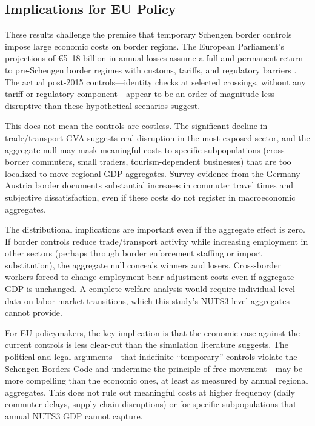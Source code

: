 \documentclass[12pt]{article}
\begin{document}
\subsection{Implications for EU Policy}

These results challenge the premise that temporary Schengen border controls impose large economic costs on border regions. The European Parliament's projections of \euro{}5--18 billion in annual losses assume a full and permanent return to pre-Schengen border regimes with customs, tariffs, and regulatory barriers \citep{EP2016Schengen}. The actual post-2015 controls---identity checks at selected crossings, without any tariff or regulatory component---appear to be an order of magnitude less disruptive than these hypothetical scenarios suggest.

This does not mean the controls are costless. The significant decline in trade/transport GVA suggests real disruption in the most exposed sector, and the aggregate null may mask meaningful costs to specific subpopulations (cross-border commuters, small traders, tourism-dependent businesses) that are too localized to move regional GDP aggregates. Survey evidence from the Germany--Austria border documents substantial increases in commuter travel times and subjective dissatisfaction, even if these costs do not register in macroeconomic aggregates.

The distributional implications are important even if the aggregate effect is zero. If border controls reduce trade/transport activity while increasing employment in other sectors (perhaps through border enforcement staffing or import substitution), the aggregate null conceals winners and losers. Cross-border workers forced to change employment bear adjustment costs even if aggregate GDP is unchanged. A complete welfare analysis would require individual-level data on labor market transitions, which this study's NUTS3-level aggregates cannot provide.

For EU policymakers, the key implication is that the economic case against the current controls is less clear-cut than the simulation literature suggests. The political and legal arguments---that indefinite ``temporary'' controls violate the Schengen Borders Code and undermine the principle of free movement---may be more compelling than the economic ones, at least as measured by annual regional aggregates. This does not rule out meaningful costs at higher frequency (daily commuter delays, supply chain disruptions) or for specific subpopulations that annual NUTS3 GDP cannot capture.
\end{document}
